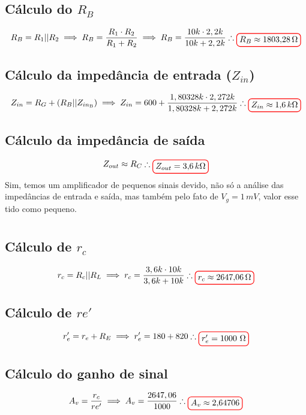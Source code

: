 \documentclass[12pt,openany,oneside,a4paper]{abntex2}
\begin{document}
\subsection{Cálculo do $R_{B}$}
\[
R_{B} = R_{1} || R_{2} \implies R_{B} = \frac{R_{1} \cdot R_{2}}{R_{1} + R_{2}} \implies R_{B} = \frac{10k \cdot 2,2k}{10k + 2,2k} \therefore \tikz[baseline]{\node[draw=red, thick, rounded corners] {$R_{B} \approx 1803{,}28\,\Omega$};}
\]

\subsection{Cálculo da impedância de entrada ($Z_{in}$)}
\[
Z_{in} = R_{G} + (R_{B} || Z_{in_{\text{B}}}) \implies Z_{in} = 600 + \frac{1,80328k \cdot 2,272k}{1,80328k + 2,272k} \therefore \tikz[baseline]{\node[draw=red, thick, rounded corners] {$Z_{in} \approx 1{,}6\,k\Omega$};}
\]

\subsection{Cálculo da impedância de saída}
\[
Z_{out} \approx R_{C} \therefore \tikz[baseline]{\node[draw=red, thick, rounded corners] {$Z_{out} = 3{,}6\,k\Omega$};}
\]Sim, temos um amplificador de pequenos sinais devido, não só a análise das impedâncias de entrada e saída, mas também pelo fato de $V_{g} = 1\,mV$, valor esse tido como pequeno.

\section{}

\subsection{Cálculo de $r_{c}$}
\[
r_{c} = R_{c} || R_{L} \implies r_{c} = \frac{3,6k \cdot 10k}{3,6k + 10k} \therefore \tikz[baseline]{\node[draw=red, thick, rounded corners] {$r_{c} \approx 2647{,}06\,\Omega$};}
\]

\subsection{Cálculo de $re'$}
\[
r_e' = r_e + R_E \implies r_e' = 180 + 820 \therefore\tikz[baseline]{\node[draw=red, thick, rounded corners] {$r_e' = 1000 \ \Omega$};}
\]

\subsection{Cálculo do ganho de sinal}
\[
A_{v} = \frac{r_{c}}{re'} \implies A_{v} = \frac{2647,06}{1000} \therefore \tikz[baseline]{\node[draw=red, thick, rounded corners] {$A_{v} \approx 2{,}64706$};}
\]
\end{document}
